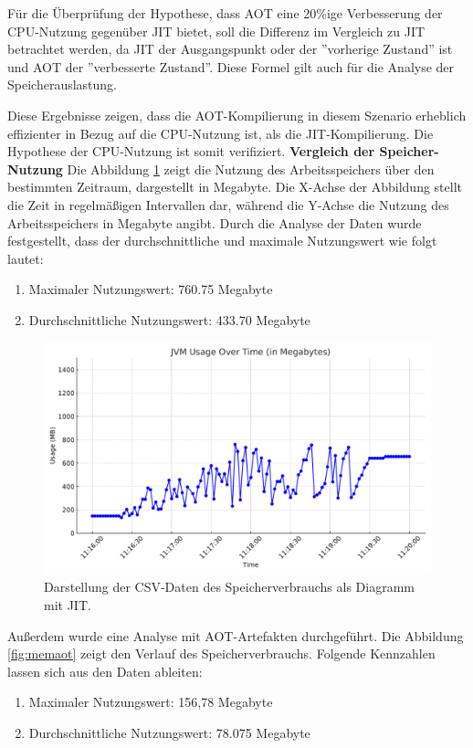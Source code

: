 Für die Überprüfung der Hypothese, dass \ac{AOT} eine 20\%ige Verbesserung der CPU-Nutzung gegenüber \ac{JIT} bietet, soll die Differenz im Vergleich zu \ac{JIT} betrachtet werden, da \ac{JIT} der Ausgangspunkt oder der ''vorherige Zustand'' ist und \ac{AOT} der ''verbesserte Zustand''. Diese Formel gilt auch für die Analyse der Speicherauslastung.

Diese Ergebnisse zeigen, dass die \ac{AOT}-Kompilierung in diesem Szenario erheblich effizienter in Bezug auf die CPU-Nutzung ist, als die \ac{JIT}-Kompilierung. Die Hypothese der CPU-Nutzung ist somit verifiziert.\newline \newline
\textbf{Vergleich der Speicher-Nutzung}\newline
Die Abbildung \ref{fig:memjit} zeigt die Nutzung des Arbeitsspeichers über den bestimmten Zeitraum, dargestellt in Megabyte. Die X-Achse der Abbildung stellt die Zeit in regelmäßigen Intervallen dar, während die Y-Achse die Nutzung des Arbeitsspeichers in Megabyte angibt.
Durch die Analyse der Daten wurde festgestellt, dass der durchschnittliche und maximale Nutzungswert wie folgt lautet:
\begin{enumerate}
    \item Maximaler Nutzungswert: 760.75 Megabyte
    \item Durchschnittliche Nutzungswert: 433.70 Megabyte
\end{enumerate}
\begin{figure}[H]
    \centering
    \includegraphics[width=12cm]{images/80_eval/JVM_Usage_Timeseries_MB_1500.pdf}
    \caption[]{Darstellung der CSV-Daten des Speicherverbrauchs als Diagramm mit \acl{JIT}.}
    \label{fig:memjit}
\end{figure}

Außerdem wurde eine Analyse mit \ac{AOT}-Artefakten durchgeführt. Die Abbildung \ref{fig:memaot} zeigt den Verlauf des Speicherverbrauchs. Folgende Kennzahlen lassen sich aus den Daten ableiten:
\begin{enumerate}
    \item Maximaler Nutzungswert: 156,78 Megabyte
    \item Durchschnittliche Nutzungswert: 78.075 Megabyte
\end{enumerate}

